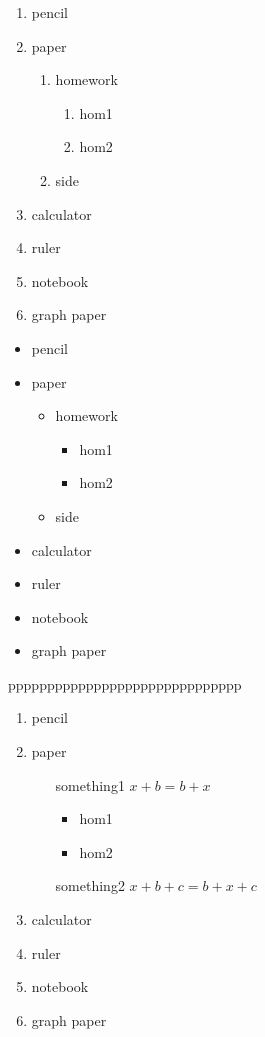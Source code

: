 \documentclass[10]{article}
\begin{document}
\begin{enumerate}
\item pencil
\item paper
	\begin{enumerate}
	\item homework
		\begin{enumerate}
		\item hom1
		\item hom2
		\end{enumerate}
	\item side
	\end{enumerate}
\item calculator
\item ruler
\item notebook
\item graph paper 
\end{enumerate}




\begin{itemize}
\item pencil
\item paper
	\begin{itemize}
	\item homework
		\begin{itemize}
		\item hom1
		\item hom2
		\end{itemize}
	\item side
	\end{itemize}
\item calculator
\item ruler
\item notebook
\item graph paper 
\end{itemize}

pppppppppppppppppppppppppppppp

\begin{enumerate}
\item pencil
\item paper
	\begin{itemize}
	\item [something1] $x+b=b+x$
		\begin{itemize}
		\item hom1
		\item hom2
		\end{itemize}
	\item [something2] $x+b+c=b+x+c$
	\end{itemize}
\item calculator
\item ruler
\item notebook
\item graph paper 
\end{enumerate}
\end{document}
